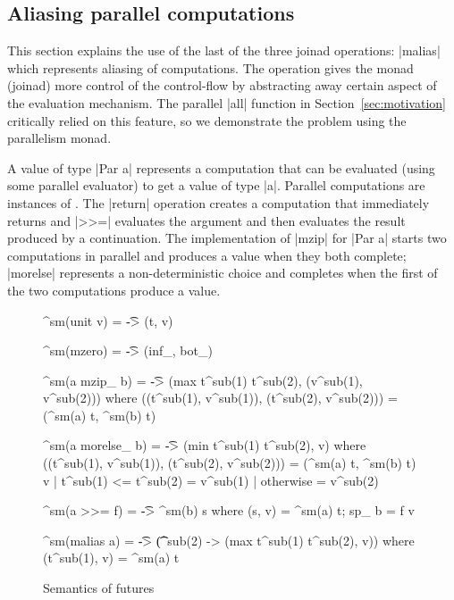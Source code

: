 \documentclass{sigplanconf}
\begin{document}

\subsection{Aliasing parallel computations}
\label{sec:intro-aliasing-parallel}

This section explains the use of the last of the three joinad operations: |malias| which 
represents aliasing of computations. The operation gives the monad (joinad) more control of
the control-flow by abstracting away certain aspect of the evaluation mechanism.
The parallel |all| function in Section~\ref{sec:motivation} 
critically relied on this feature, so we demonstrate the problem using the parallelism monad.

A value of type |Par a| represents a computation that can be evaluated (using some parallel evaluator) 
to get a value of type |a|. Parallel computations are instances of . The |return|
operation creates a computation that immediately returns and |>>=| 
evaluates the argument and then evaluates the result produced by a continuation.
The implementation of |mzip| for |Par a| starts two computations in parallel and produces a value 
when they both complete; |morelse| represents a non-deterministic choice and completes when the first 
of the two computations produce a value.

\begin{figure}
\begin{code}
^sm(unit v)        = \t -> (t, v)

^sm(mzero)         = \t -> (inf_, bot_)

^sm(a mzip_ b)     = \t -> (max t^sub(1) t^sub(2), (v^sub(1), v^sub(2)))
	where  ((t^sub(1), v^sub(1)), (t^sub(2), v^sub(2))) = (^sm(a) t, ^sm(b) t)

^sm(a morelse_ b)  = \t -> (min t^sub(1) t^sub(2), v)
	where  ((t^sub(1), v^sub(1)), (t^sub(2), v^sub(2))) = (^sm(a) t, ^sm(b) t)
	       v | t^sub(1) <= t^sub(2) = v^sub(1) | otherwise = v^sub(2)

^sm(a >>= f)       = \t -> ^sm(b) s
	where  (s, v) = ^sm(a) t; sp_ b = f v

^sm(malias a)      = \t -> (\t^sub(2) -> (max t^sub(1) t^sub(2), v))
	where (t^sub(1), v) = ^sm(a) t
\end{code}
\caption{Semantics of futures}
\label{fig:future-semantics}
\end{figure}
\end{document}
